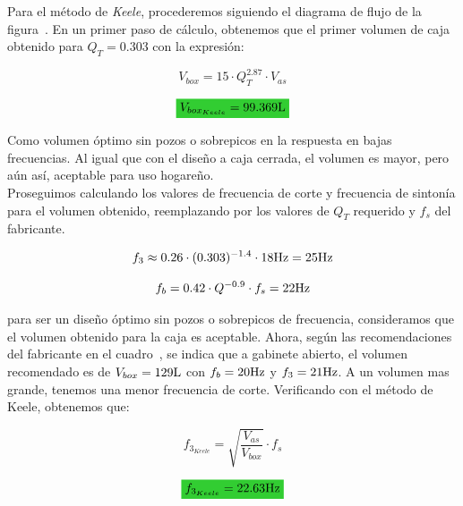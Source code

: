 
\normalfont

Para el método de \textit{Keele}, procederemos siguiendo el diagrama de flujo de la figura~. En un primer paso de cálculo, obtenemos que el primer volumen de caja obtenido para $Q_{T} = 0.303$ con la expresión:


\begin{equation}
 V_{box} = 15 \cdot Q_{T}^{2.87} \cdot V_{as}
\end{equation}


\begin{equation*}
\mathcolorbox{EQColor}{ V_{box_{Keele}} = 99.369 \si[per-mode=symbol]{\liter} }
\end{equation*}
 
 
Como volumen óptimo sin pozos o sobrepicos en la respuesta en bajas frecuencias. Al igual que con el diseño a caja cerrada, el volumen es mayor, pero aún así, aceptable para uso hogareño.\\

Proseguimos calculando los valores de frecuencia de corte y frecuencia de sintonía para el volumen obtenido, reemplazando por los valores de $Q_{T}$ requerido y $f_{s}$ del fabricante.

\begin{equation*}
f_{3} \approx 0.26 \cdot (0.303)^{-1.4} \cdot 18 \si[per-mode=symbol]{\hertz} = 25 \si[per-mode=symbol]{\hertz}
\end{equation*}

\begin{equation*}
f_{b} = 0.42 \cdot Q^{-0.9} \cdot f_{s} = 22 \si[per-mode=symbol]{\hertz}
\end{equation*}


para ser un diseño óptimo sin pozos o sobrepicos de frecuencia, consideramos que el volumen obtenido para la caja es aceptable. Ahora, según las recomendaciones del fabricante en el cuadro~, se indica que a gabinete abierto, el volumen recomendado es de $V_{box} = 129 \si[per-mode=symbol]{\liter} $ con $f_{b} = 20 \si[per-mode=symbol]{\hertz}$ y $f_{3} = 21 \si[per-mode=symbol]{\hertz}$. A un volumen mas grande, tenemos una menor frecuencia de corte. Verificando con el método de Keele, obtenemos que:


\begin{equation}
f_{3_{Keele}} = \sqrt{\frac{V_{as}}{V_{box}}} \cdot f_{s}
\end{equation}


\begin{equation*}
\mathcolorbox{EQColor}{ f_{3_{Keele}} = 22.63 \si[per-mode=symbol]{\hertz} }
\end{equation*}

